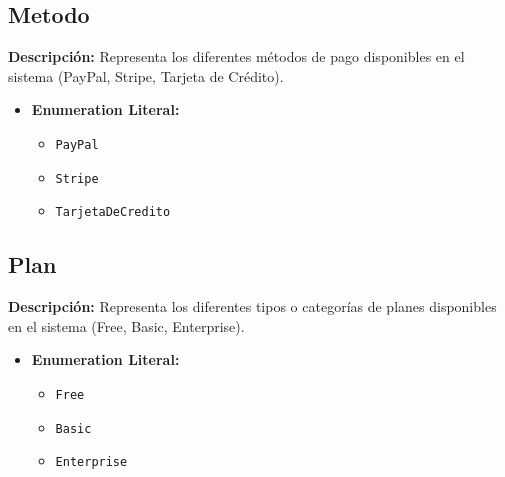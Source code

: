 \documentclass[12pt.a4paper]{article}
\begin{document}
\subsection{Metodo}
     \textbf{Descripción:} Representa los diferentes métodos de pago disponibles en el sistema (PayPal, Stripe, Tarjeta de Crédito).
    \begin{itemize}
        \item {\textbf{Enumeration Literal:}}
        \begin{itemize}
            \item \texttt{PayPal}
            \item \texttt{Stripe}
            \item \texttt{TarjetaDeCredito}
        \end{itemize}
    \end{itemize}


\subsection{Plan}
     \textbf{Descripción:}  Representa los diferentes tipos o categorías de planes disponibles en el sistema (Free, Basic, Enterprise).
    \begin{itemize}
        \item {\textbf{Enumeration Literal:}}
        \begin{itemize}
            \item \texttt{Free}
            \item \texttt{Basic}
            \item \texttt{Enterprise}
        \end{itemize}
    \end{itemize}
\end{document}
